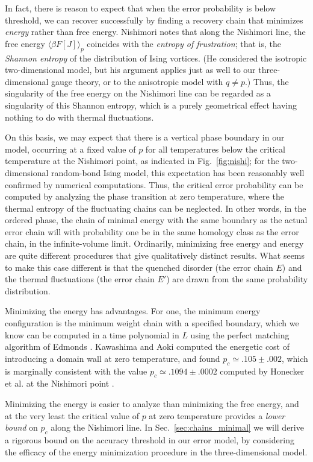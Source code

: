 In fact, there is reason to expect that when the error probability is below threshold, we can recover successfully by finding a recovery chain that minimizes {\em energy} rather than free energy. Nishimori \cite{nish_vert}  notes that along the Nishimori line, the free energy $\langle\beta F[J]\rangle_p$ coincides with the {\em entropy of frustration}; that is, the {\em Shannon entropy} of the distribution of Ising vortices. (He considered the isotropic two-dimensional model, but his argument applies just as well to our three-dimensional gauge theory, or to the anisotropic model with $q\ne p$.) Thus, the singularity of the free energy on the Nishimori line can be regarded as a singularity of this Shannon entropy, which is a purely geometrical effect having nothing to do with thermal fluctuations. 

On this basis, we may expect that there is a vertical phase boundary in our model, occurring at a fixed value of $p$ for all temperatures below the critical temperature at the Nishimori point, as indicated in Fig.~\ref{fig:nishi}; for the two-dimensional random-bond Ising model, this expectation has been reasonably well confirmed by numerical computations. Thus, the critical error probability can be computed by analyzing the phase transition at zero temperature, where the thermal entropy of the fluctuating chains can be neglected. In other words, in the ordered phase, the chain of minimal energy with the same boundary as the actual error chain will with probability one be in the same homology class as the error chain, in the infinite-volume limit. Ordinarily, minimizing free energy and energy are quite different procedures that give qualitatively distinct results. What seems to make this case different is that the quenched disorder (the error chain $E$) and the thermal fluctuations (the error chain $E'$) are drawn from the same probability distribution. 

Minimizing the energy has advantages. For one, the minimum energy configuration is the minimum weight chain with a specified boundary, which we know can be computed in a time polynomial in $L$ using the perfect matching algorithm of Edmonds \cite{edmonds,barahona_match}. Kawashima and Aoki \cite{kawashima} computed the energetic cost of introducing a domain wall at zero temperature, and found $p_c \simeq .105 \pm .002$, which is marginally consistent with the value  $p_c\simeq .1094\pm .0002$ computed by Honecker et al. at the Nishimori point \cite{honecker}.

Minimizing the energy is easier to analyze than minimizing the free energy, and at the very least the critical value of $p$ at zero temperature provides a {\em lower bound} on $p_c$ along the Nishimori line. In Sec.~\ref{sec:chains_minimal} we will derive a rigorous bound on the accuracy threshold in our error model, by considering the efficacy of the energy minimization procedure in the three-dimensional model.


